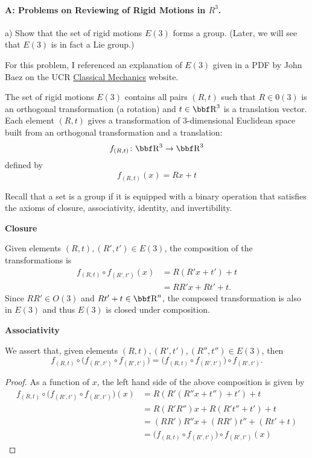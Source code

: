 \documentclass[12pt,letterpaper,boxed]{hmcpset}
\begin{document}
\paragraph{A: Problems on Reviewing of Rigid Motions in $R^3$.}
\begin{itemize}

{\item a) Show that the set of rigid motions $E(3)$ forms a group. 
(Later, we will see that  $E(3)$ is in fact a Lie group.)} 
 
\end{itemize}

\begin{solution}
 For this problem, I referenced an explanation of $E(3)$ given in a PDF by John Baez on the UCR \href{http://math.ucr.edu/home/baez/classical/galilei_pro.pdf}{Classical Mechanics} website.

The set of rigid motions $E(3)$ contains all pairs $(R, t)$ such that $R \in 0(3)$ is an orthogonal transformation (a rotation) and $t \in \RR^3$  is a translation vector. Each element $(R, t)$ gives a transformation of $3$-dimensional Euclidean space built from an orthogonal transformation and a translation:
\[
f_{(R, t)} \colon \RR^3 \to \RR^3
\]
defined by 
\[
f_{(R, t)}(x) = Rx + t
\]


Recall that a set is a group if it is equipped with a binary operation that satisfies the axioms of closure, associativity, identity, and invertibility.

\textbf{Closure}

Given elements $(R, t) , (R', t') \in E(3)$, the composition of the transformations is 
\begin{align*}
    f_{(R, t)} \circ f_{(R', t')}(x) 
    &= R (R' x + t') + t\\
    &= RR'x + Rt' + t.
\end{align*}
Since $RR' \in O(3)$ and $Rt' + t \in \RR^n$, the composed transformation is also in $E(3)$ and thus $E(3)$ is closed under composition. 

\textbf{Associativity}

We assert that, given elements $(R,t), (R',t'), (R'', t'') \in E(3)$, then
\[
f_{(R, t)} \circ \Big(f_{(R', t')} \circ f_{(R', t')}\Big) = \Big(f_{(R, t)} \circ f_{(R', t')}\Big) \circ f_{(R', t')}.
\]
\begin{proof}
As a function of $x$, the left hand side of the above composition is given by
\begin{align*}
   f_{(R, t)} \circ \Big(f_{(R', t')} \circ f_{(R', t')}\Big)(x)
   &= R (R' (R''x + t'') + t') + t\\
   &= R(R'R'')x + R(R't'' + t') + t \\
   &= (RR')R''x + (RR')t'' + (Rt' + t)\\
   &= \Big(f_{(R, t)} \circ f_{(R', t')}\Big) \circ f_{(R', t')}(x)
\end{align*}
\end{proof}


\end{solution}
\end{document}
